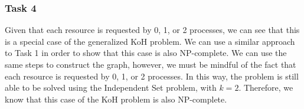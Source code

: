 \documentclass[12pt,letterpaper]{article}
\begin{document}
\subsubsection*{Task 4}

Given that each resource is requested by 0, 1, or 2 processes, we can see that this is a special case of the generalized KoH problem. We can use a similar approach to Task 1 in order to show that this case is also NP-complete. We can use the same steps to construct the graph, however, we must be mindful of the fact that each resource is requested by 0, 1, or 2 processes. In this way, the problem is still able to be solved using the Independent Set problem, with $k = 2$. Therefore, we know that this case of the KoH problem is also NP-complete. 
\end{document}
